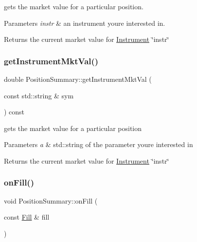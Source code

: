 gets the market value for a particular position. 


\begin{DoxyParams}{Parameters}
{\em instr} & an instrument you\textquotesingle{}re interested in. \\
\hline
\end{DoxyParams}
\begin{DoxyReturn}{Returns}
the current market value for \hyperlink{classInstrument}{Instrument} \char`\"{}instr\char`\"{} 
\end{DoxyReturn}
\mbox{\label{classPositionSummary_a66ed8d8382b50aaca12fd889a2fd6c31}} 
\subsubsection{\texorpdfstring{get\+Instrument\+Mkt\+Val()}{getInstrumentMktVal()}\hspace{0.1cm}{\footnotesize\ttfamily [2/2]}}
{\footnotesize\ttfamily double Position\+Summary\+::get\+Instrument\+Mkt\+Val (\begin{DoxyParamCaption}\item[{const std\+::string \&}]{sym }\end{DoxyParamCaption}) const}



gets the market value for a particular position 


\begin{DoxyParams}{Parameters}
{\em a} & std\+::string of the parameter you\textquotesingle{}re interested in \\
\hline
\end{DoxyParams}
\begin{DoxyReturn}{Returns}
the current market value for \hyperlink{classInstrument}{Instrument} \char`\"{}instr\char`\"{} 
\end{DoxyReturn}
\mbox{\label{classPositionSummary_a057618b9fbc23598a7353555ff280a44}} 
\subsubsection{\texorpdfstring{on\+Fill()}{onFill()}}
{\footnotesize\ttfamily void Position\+Summary\+::on\+Fill (\begin{DoxyParamCaption}\item[{const \hyperlink{classFill}{Fill} \&}]{fill }\end{DoxyParamCaption})}



